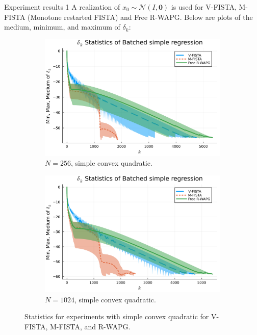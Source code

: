 \documentclass[11pt]{beamer}
\theoremstyle{definition}
\begin{document}
        \begin{frame}{Experiment results 1}
            A realization of $x_0 \sim \mathcal N(I, \mathbf 0)$ is used for V-FISTA, M-FISTA (Monotone restarted FISTA) and Free R-WAPG. 
            Below are plots of the medium, minimum, and maximum of $\delta_k$: 
            \begin{figure}[H]
                \begin{subfigure}[b]{0.47\textwidth}
                    \centering
                    \includegraphics[width=\textwidth]{assets/simple_regression_batched-256.png}
                    \caption{$N = 256$, simple convex quadratic.}
                \end{subfigure}
                \hfill
                \begin{subfigure}[b]{0.47\textwidth}
                    \centering
                    \includegraphics[width=\textwidth]{assets/simple_regression_batched-1024.png}
                    \caption{$N = 1024$, simple convex quadratic. }
                \end{subfigure}
                \caption{
                    Statistics for experiments with simple convex quadratic for V-FISTA, M-FISTA, and R-WAPG.
                }
                \label{fig:simple-quadratic-NOG}
            \end{figure}
        \end{frame}
\end{document}
